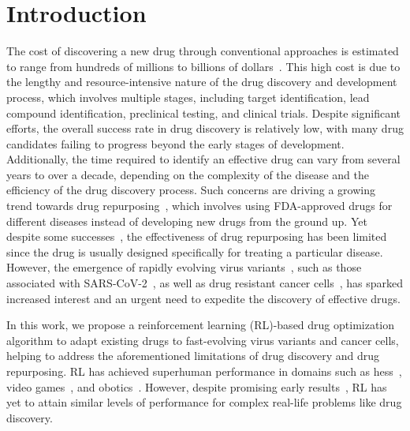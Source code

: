 \section{Introduction}\label{sec:intro}






The cost of discovering a new drug through conventional approaches is estimated to range from hundreds of millions to billions of dollars~\citep{dickson2009cost}. 
This high cost is due to the lengthy and resource-intensive nature of the drug discovery and development process, which involves multiple stages, including target identification, lead compound identification, preclinical testing, and clinical trials. 
Despite significant efforts, the overall success rate in drug discovery is relatively low, with many drug candidates failing to progress beyond the early stages of development. 
Additionally, the time required to identify an effective drug can vary from several years to over a decade, depending on the complexity of the disease and the efficiency of the drug discovery process.
Such concerns are driving a growing trend towards drug repurposing~\citep{avram2023drugcentral}, which involves using FDA-approved drugs for different diseases instead of developing new drugs from the ground up. Yet despite some successes~\citep{pushpakom2019drug}, the effectiveness of drug repurposing has been limited since the drug is usually designed specifically for treating a particular disease. 
However, the emergence of rapidly evolving virus variants~\citep{hadj2022covid}, such as those associated with SARS-CoV-2~\citep{yuki2020covid}, as well as drug resistant cancer cells~\citep{MANS2017}, has sparked increased interest and  an urgent need to expedite the discovery of effective drugs. 

In this work, we 
propose
a reinforcement learning (RL)-based drug optimization {algorithm} to adapt existing drugs to fast-evolving virus variants and cancer cells, helping to address 
the aforementioned limitations of drug discovery and drug repurposing.  
RL has achieved superhuman performance in domains such as hess~\citep{lai2015giraffe}, video games~\citep{mnih2013playing}, and obotics~\citep{brunke2022safe}.
However, despite promising early results~\citep{born2021paccmannrl, guimaraes2017objective, jin2020multi, neil2018exploring, tan2022drlinker, zhang2023universal}, RL has yet to attain similar levels of performance for complex real-life problems like drug discovery. 

